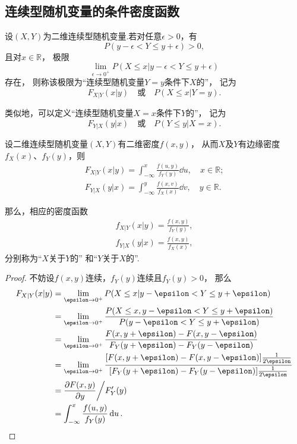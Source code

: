 \subsection{连续型随机变量的条件密度函数}
\begin{definition}
设\((X,Y)\)为二维连续型随机变量.若对任意\(\epsilon > 0\)，有\[
	P(y - \epsilon < Y \leq y + \epsilon) > 0,
\]
且对\(x\in\mathbb{R}\)，
极限\[
	\lim_{\epsilon\to0^+} P(X \leq x \vert y - \epsilon < Y \leq y + \epsilon)
\]存在，
则称该极限为“连续型随机变量\(Y=y\)条件下\(X\)的”，
记为\[
	F_{X \vert Y}(x \vert y)
	\quad\text{或}\quad
	P(X \leq x \vert Y = y).
\]

类似地，可以定义“连续型随机变量\(X=x\)条件下\(Y\)的”，
记为\[
	F_{Y \vert X}(y \vert x)
	\quad\text{或}\quad
	P(Y \leq y \vert X = x).
\]
\end{definition}

\begin{theorem}
设二维连续型随机变量\((X,Y)\)有二维密度\(f(x,y)\)，
从而\(X\)及\(Y\)有边缘密度\(f_X(x)\)、\(f_Y(y)\)，则
\begin{align*}
	F_{X \vert Y}(x \vert y)
	= \int_{-\infty}^x \frac{f(u,y)}{f_Y(y)}\dd{u}, \quad x \in \mathbb{R}; \\
	F_{Y \vert X}(y \vert x)
	= \int_{-\infty}^y \frac{f(x,v)}{f_X(x)}\dd{v}, \quad y \in \mathbb{R}.
\end{align*}

那么，相应的密度函数
\begin{gather}
	f_{X \vert Y}(x \vert y)
	= \frac{f(x,y)}{f_Y(y)},
		\label{equation:多维随机变量及其分布.条件密度、联合密度、边缘密度的关系1} \\
	f_{Y \vert X}(y \vert x)
	= \frac{f(x,y)}{f_X(x)},
		\label{equation:多维随机变量及其分布.条件密度、联合密度、边缘密度的关系2}
\end{gather}
分别称为“\(X\)关于\(Y\)的”%
和“\(Y\)关于\(X\)的”.
\begin{proof}
不妨设\(f(x,y)\)连续，\(f_Y(y)\)连续且\(f_Y(y)>0\)，
\def\l{\lim_{\epsilon\to0^+}}%
那么\begin{align*}
	F_{X \vert Y}(x \vert y)
	&= \lim_{\epsilon\to0^+}
		P(X \leq x \vert y - \epsilon < Y \leq y + \epsilon) \\
	&= \lim_{\epsilon\to0^+}
		\frac{
			P(X \leq x, y - \epsilon < Y \leq y + \epsilon)
		}{
			P(y - \epsilon < Y \leq y + \epsilon)
		} \\
	&= \lim_{\epsilon\to0^+}
		\frac{
			F(x,y+\epsilon) - F(x,y-\epsilon)
		}{
			F_Y(y+\epsilon) - F_Y(y-\epsilon)
		} \\
	&= \lim_{\epsilon\to0^+}
		\frac{
			[F(x,y+\epsilon) - F(x,y-\epsilon)] \frac{1}{2 \epsilon}
		}{
			[F_Y(y+\epsilon) - F_Y(y-\epsilon)] \frac{1}{2 \epsilon}
		} \\
	&= \pdv{F(x,y)}{y} \bigg/ F_Y'(y) \\
	&= \int_{-\infty}^x \frac{f(u,y)}{f_Y(y)} \dd{u}.
	\qedhere
\end{align*}
\end{proof}
\end{theorem}

